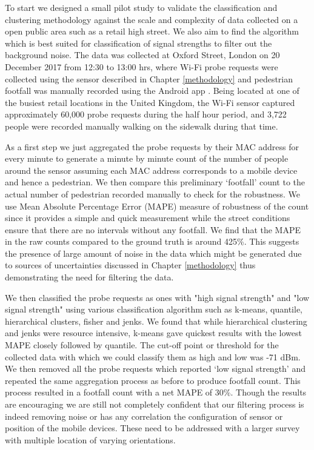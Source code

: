 To start we designed a small pilot study to validate the classification and clustering methodology against the scale and complexity of data collected on a open public area such as a retail high street.
We also aim to find the algorithm which is best suited for classification of signal strengths to filter out the background noise.
The data was collected at Oxford Street, London on 20 December 2017 from 12:30 to 13:00 hrs, where Wi-Fi probe requests were collected using the sensor described in Chapter \ref{methodology} and pedestrian footfall was manually recorded using the Android app \citep{bala2018clicker}.
Being located at one of the busiest retail locations in the United Kingdom, the Wi-Fi sensor captured approximately 60,000 probe requests during the half hour period, and 3,722 people were recorded manually walking on the sidewalk during that time.

As a first step we just aggregated the probe requests by their MAC address for every minute to generate a minute by minute count of the number of people around the sensor assuming each MAC address corresponds to a mobile device and hence a pedestrian.
We then compare this preliminary `footfall' count to the actual number of pedestrian recorded manually to check for the robustness. We use Mean Absolute Percentage Error (MAPE) measure of robustness of the count since it provides a simple and quick measurement while the street conditions ensure that there are no intervals without any footfall.
We find that the MAPE in the raw counts compared to the ground truth is around 425\%.
This suggests the presence of large amount of noise in the data which might be generated due to sources of uncertainties discussed in Chapter \ref{methodology} thus demonstrating the need for filtering the data.

We then classified the probe requests as ones with "high signal strength" and "low signal strength" using various classification algorithm such as k-means, quantile, hierarchical clusters, fisher and jenks.
We found that while hierarchical clustering and jenks were resource intensive, k-means gave quickest results with the lowest MAPE closely followed by quantile.
The cut-off point or threshold for the collected data with which we could classify them as high and low was -71 dBm.
We then removed all the probe requests which reported `low signal strength' and repeated the same aggregation process as before to produce footfall count. 
This process resulted in a footfall count with a net MAPE of 30\%.
Though the results are encouraging we are still not completely confident that our filtering process is indeed removing noise or has any correlation the configuration of sensor or position of the mobile devices.
These need to be addressed with a larger survey with multiple location of varying orientations.

